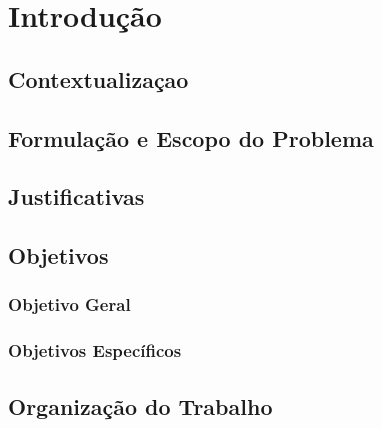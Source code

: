 \chapter{Introdução}



\section{Contextualizaçao}



\section{Formulação e Escopo do Problema}



\section{Justificativas}



\section{Objetivos}



\subsection{Objetivo Geral}



\subsection{Objetivos Específicos}



\section{Organização do Trabalho}



